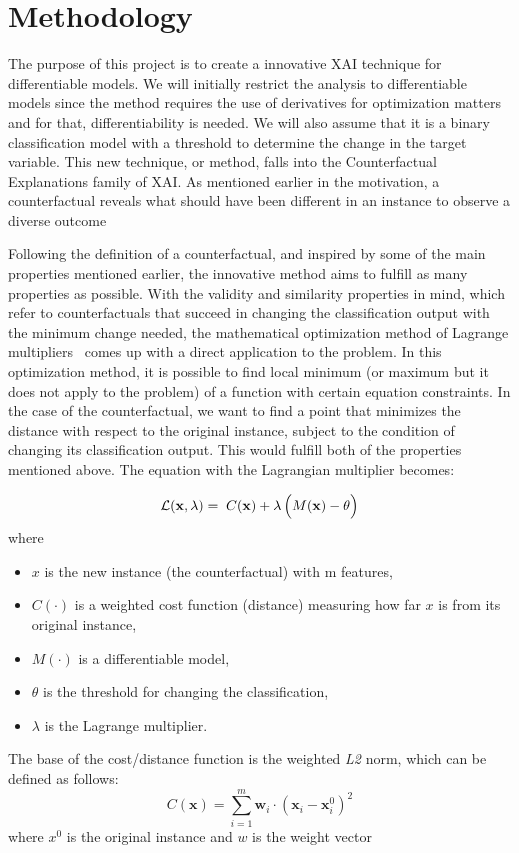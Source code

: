 \documentclass[12pt]{extarticle}
\numberwithin{equation}{section}
\begin{document}
\section{Methodology}\label{sec:methodology}
The purpose of this project is to create a innovative XAI technique for differentiable models. We will initially restrict the analysis to differentiable models since the method requires the use of derivatives for optimization matters and for that, differentiability is needed. We will also assume that it is a binary classification model with a threshold to determine the change in the target variable. This new technique, or method, falls into the Counterfactual Explanations family of XAI. As mentioned earlier in the motivation, a counterfactual reveals what should have been different in an instance to observe a diverse outcome

Following the definition of a counterfactual, and inspired by some of the main properties mentioned earlier, the innovative method aims to fulfill as many properties as possible. With the validity and similarity properties in mind, which refer to counterfactuals that succeed in changing the classification output with the minimum change needed, the mathematical optimization method of Lagrange multipliers~\cite{lagrange} comes up with a direct application to the problem. In this optimization method, it is possible to find local minimum (or maximum but it does not apply to the problem) of a function with certain equation constraints. In the case of the counterfactual, we want to find a point that minimizes the distance with respect to the original instance, subject to the condition of changing its classification output. This would fulfill both of the properties mentioned above. The equation with the Lagrangian multiplier becomes:

\begin{equation}\label{eq:lagrange}
\mathcal{L}(\mathbf{x}, \lambda) = \; C(\mathbf{x}) + \lambda \, \Bigl(M(\mathbf{x}) - \theta \Bigr)
\end{equation}
where
\begin{itemize}
  \item $x$ is the new instance (the counterfactual) with m features,
  \item $C(\cdot)$ is a weighted cost function (distance) measuring how far $x$ is from its original instance,
  \item $M(\cdot)$ is a differentiable model, 
  \item $\theta$ is the threshold for changing the classification,
  \item $\lambda$ is the Lagrange multiplier.
\end{itemize}
The base of the cost/distance function is the weighted \emph{L2} norm, which can be defined as follows:
\begin{equation}\label{eq:cost}
    C(\mathbf{x}) = \sum_{i=1}^{m} \mathbf{w}_i \cdot (\mathbf{x}_i - \mathbf{x}^0_{i})^2
\end{equation}
where $x^0$ is the original instance and $w$ is the weight vector
\end{document}

